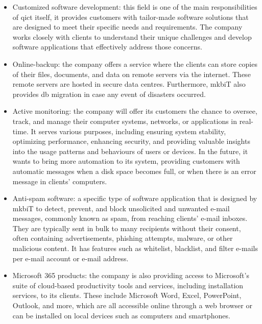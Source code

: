 \begin{multicols}{2}
      \begin{itemize}
            \item Customized software development: this field is one of the main responsibilities of \acrshort{qict} itself, it provides
                  customers with tailor-made software solutions that are designed to meet their specific needs and requirements. The company
                  works closely with clients to understand their unique challenges and develop software applications that effectively address
                  those concerns.
            \item Online-backup: the company offers a service where the clients can store copies of their files, documents, and data on remote
                  servers via the internet. These remote servers are hosted in secure data centres. Furthermore, \acrshort{mkb}iT also provides
                  \acrshort{db} migration in case any event of disasters occurred.
            \item Active monitoring: the company will offer its customers the chance to oversee, track, and manage their computer systems,
                  networks, or applications in real-time. It serves various purposes, including ensuring system stability, optimizing
                  performance, enhancing security, and providing valuable insights into the usage patterns and behaviours of users or devices.
                  In the future, it wants to bring more automation to its system, providing customers with automatic messages when a disk space
                  becomes full, or when there is an error message in clients' computers.
            \item Anti-spam software: a specific type of software application that is designed by \acrshort{mkb}iT to detect, prevent, and block
                  unsolicited and unwanted e-mail messages, commonly known as spam, from reaching clients' e-mail inboxes. They are typically
                  sent in bulk to many recipients without their consent, often containing advertisements, phishing attempts, malware, or other
                  malicious content. It has features such as whitelist, blacklist, and filter e-mails per e-mail account or e-mail address.
            \item Microsoft 365 products: the company is also providing access to Microsoft's suite of cloud-based productivity tools and
                  services, including installation services, to its clients. These include Microsoft Word, Excel, PowerPoint, Outlook, and more,
                  which are all accessible online through a web browser or can be installed on local devices such as computers and smartphones.

\end{itemize}
\end{multicols}
